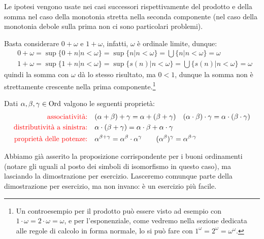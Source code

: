 \begin{soln}
	Le ipotesi vengono usate nei casi successori rispettivamente del prodotto e della somma nel caso della monotonia stretta nella seconda componente (nel caso della monotonia debole sulla prima non ci sono particolari problemi).
\end{soln}

\begin{remark}
	Basta considerare $0 + \omega$ e $1 + \omega$, infatti, $\omega$ \`e ordinale limite, dunque:
	\begin{align*}
		& 0 + \omega = \sup \{0 + n | n < \omega\} = \sup \{n | n < \omega\} = \bigcup \{n | n < \omega\} = \omega \\
		& 1 + \omega = \sup \{1 + n | n < \omega\} = \sup \{s(n) | n < \omega\} = \bigcup \{s(n) | n < \omega\} = \omega
	\end{align*}
	quindi la somma con $\omega$ d\`a lo stesso risultato, ma $0 < 1$, dunque la somma non \`e strettamente crescente nella prima componente.\footnote{Un controesempio per il prodotto pu\`o essere visto ad esempio con $1 \cdot \omega = 2 \cdot \omega = \omega$, e per l'esponenziale,
	come vedremo nella sezione dedicata alle regole di calcolo in forma normale, lo si pu\`o fare con $1^\omega = 2^\omega = \omega^\omega$.}
\end{remark}

\begin{proposition}
	Dati $\alpha,\beta,\gamma \in \operatorname{Ord}$ valgono le seguenti propriet\`a:
	\[\begin{split}
		\text{\textcolor{red}{associativit\`a:}} &\quad (\alpha + \beta) + \gamma = \alpha + (\beta + \gamma) \quad (\alpha \cdot \beta) \cdot \gamma = \alpha \cdot (\beta \cdot \gamma)\\
		\text{\textcolor{red}{distributivit\`a a sinistra:}} &\quad  \alpha \cdot (\beta + \gamma) = \alpha \cdot \beta + \alpha \cdot \gamma \\
		\text{\textcolor{red}{propriet\`a delle potenze:}} &\quad {\alpha}^{\beta + \gamma} = \alpha^{\beta} \cdot \alpha^{\gamma} \qquad ({\alpha}^{\beta})^{\gamma} = {\alpha}^{\beta \cdot \gamma}
	\end{split}\]
\end{proposition}

\begin{note}
	Abbiamo gi\`a asserito la proposizione corrispondente per i buoni ordinamenti (notare gli uguali al posto dei simboli di isomorfismo in questo caso), ma lasciando la dimostrazione per esercizio.
	Lasceremo comunque parte della dimostrazione per esercizio, ma non invano: \`e un esercizio pi\`u facile.
\end{note}

